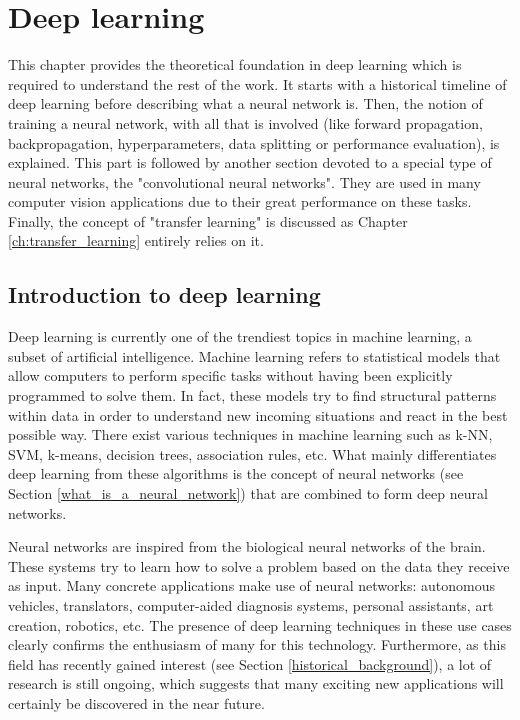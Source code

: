 
\chapter{Deep learning}
\label{ch:deep_learning}
\setlength{\marginparwidth}{3cm}\leavevmode {}This chapter provides the theoretical foundation in deep learning which is required to understand the rest of the work. It starts with a historical timeline of deep learning before describing what a neural network is. Then, the notion of training a neural network, with all that is involved (like forward propagation, backpropagation, hyperparameters, data splitting or performance evaluation), is explained. This part is followed by another section devoted to a special type of neural networks, the "convolutional neural networks". They are used in many computer vision applications due to their great performance on these tasks. Finally, the concept of "transfer learning" is discussed as Chapter \ref{ch:transfer_learning} entirely relies on it.


\section{Introduction to deep learning}
\setlength{\marginparwidth}{3cm}\leavevmode {}Deep learning is currently one of the trendiest topics in machine learning, a subset of artificial intelligence. Machine learning refers to statistical models that allow computers to perform specific tasks without having been explicitly programmed to solve them. In fact, these models try to find structural patterns within data in order to understand new incoming situations and react in the best possible way. There exist various techniques in machine learning such as k-NN, SVM, k-means, decision trees, association rules, etc. What mainly differentiates deep learning from these algorithms is the concept of neural networks (see Section  \ref{what_is_a_neural_network}) that are combined to form deep neural networks.

Neural networks are inspired from the biological neural networks of the brain. These systems try to learn how to solve a problem based on the data they receive as input. Many concrete applications make use of neural networks: autonomous vehicles, translators, computer-aided diagnosis systems, personal assistants, art creation, robotics, etc. The presence of deep learning techniques in these use cases clearly confirms the enthusiasm of many for this technology. Furthermore, as this field has recently gained interest (see Section \ref{historical_background}), a lot of research is still ongoing, which suggests that many exciting new applications will certainly be discovered in the near future.

